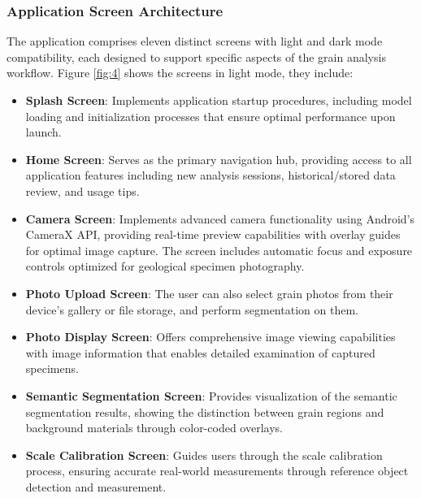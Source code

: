 \documentclass[final-report]{report-template}
\begin{document}
\subsubsection{Application Screen Architecture}
The application comprises eleven distinct screens with light and dark mode compatibility, each designed to support specific aspects of the grain analysis workflow. Figure \ref{fig:4} shows the screens in light mode, they include:
\begin{itemize}
    \item \textbf{Splash Screen}: Implements application startup procedures, including model loading and initialization processes that ensure optimal performance upon launch.
\end{itemize}
\begin{itemize}
    \item \textbf{Home Screen}: Serves as the primary navigation hub, providing access to all application features including new analysis sessions, historical/stored data review, and usage tips.
\end{itemize}
\begin{itemize}
    \item \textbf{Camera Screen}: Implements advanced camera functionality using Android's CameraX API, providing real-time preview capabilities with overlay guides for optimal image capture. The screen includes automatic focus and exposure controls optimized for geological specimen photography.
\end{itemize}
\begin{itemize}
    \item \textbf{Photo Upload Screen}: The user can also select grain photos from their device's gallery or file storage, and perform segmentation on them.
\end{itemize}
\begin{itemize}
    \item \textbf{Photo Display Screen}: Offers comprehensive image viewing capabilities with image information that enables detailed examination of captured specimens.
\end{itemize}
\begin{itemize}
    \item \textbf{Semantic Segmentation Screen}: Provides visualization of the semantic segmentation results, showing the distinction between grain regions and background materials through color-coded overlays.
\end{itemize}
\begin{itemize}
    \item \textbf{Scale Calibration Screen}: Guides users through the scale calibration process, ensuring accurate real-world measurements through reference object detection and measurement.
\end{itemize}
\end{document}
